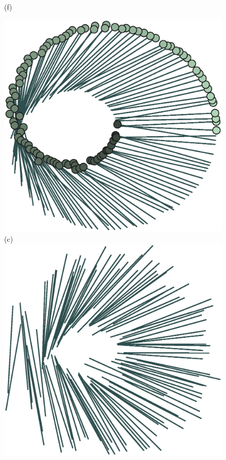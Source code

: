 \begin{figure}[!t]
\begin{minipage}[t]{0.25\textwidth}
		(f)
	\end{minipage}%
	\begin{minipage}[t]{0.25\textwidth}
		\centering
		\includegraphics[width=0.9\columnwidth]{./figs/plushalf_reruns_0.eps}\\
		(c)\\ \vspace{0.5cm}
		\includegraphics[width=0.9\columnwidth]{./figs/plushalf_reruns_1.eps}\\

\end{minipage}
\end{figure}
